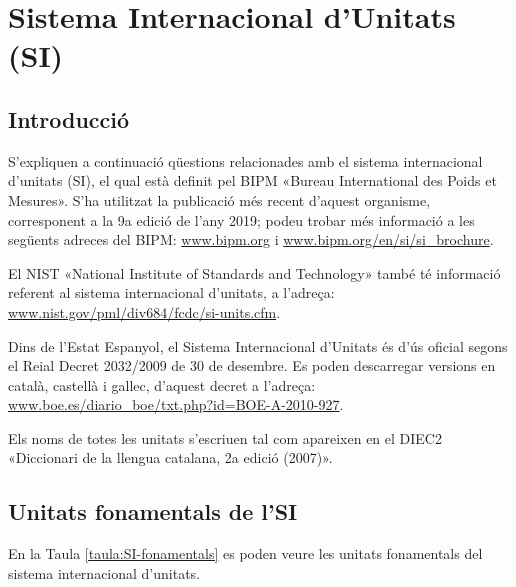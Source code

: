 \chapter{Sistema Internacional d'Unitats (SI)}\label{sec:SI}

\section{Introducció}
S'expliquen a continuació qüestions relacionades amb el sistema
internacional d'unitats (SI), el qual està definit pel BIPM «Bureau
International des Poids et Mesures». S'ha utilitzat la publicació més recent d'aquest organisme, corresponent a la 9a edició de l'any 2019; podeu trobar més informació a les següents adreces del BIPM: \href{http://www.bipm.org/}{www.bipm.org} i
\href{http://www.bipm.org/en/si/si_brochure/}{www.bipm.org/en/si/si\_brochure}.

El NIST «National Institute of Standards and Technology» també té informació referent al sistema
internacional d'unitats, a l'adreça: \href{http://www.nist.gov/pml/div684/fcdc/si-units.cfm}
{www.nist.gov/pml/div684/fcdc/si-units.cfm}.

Dins de l'Estat Espanyol, el Sistema Internacional d'Unitats és d'ús oficial segons el Reial Decret 2032/2009 de 30 de desembre. Es poden descarregar versions en català, castellà i gallec, d'aquest decret a l'adreça: \href{http://www.boe.es/diario_boe/txt.php?id=BOE-A-2010-927}
{www.boe.es/diario\_boe/txt.php?id=BOE-A-2010-927}.

Els noms de totes les unitats s'escriuen tal com apareixen en el DIEC2 «Diccionari de la llengua catalana, 2a edició (2007)».

\section{Unitats fonamentals de l'SI}

En la Taula \vref{taula:SI-fonamentals} es poden veure les unitats
fonamentals del sistema internacional d'unitats.


